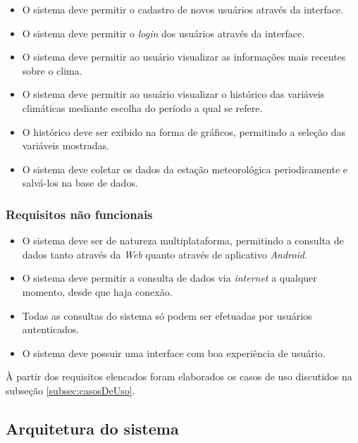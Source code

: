 \begin{itemize}
    \item O sistema deve permitir o cadastro de novos usuários através da interface.
    
    \item O sistema deve permitir o \textit{login} dos usuários através da interface.

    \item O sistema deve permitir ao usuário visualizar as informações mais recentes sobre o clima.

    \item O sistema deve permitir ao usuário visualizar o histórico das variáveis climáticas mediante escolha do período a qual se refere.

	\item O histórico deve ser exibido na forma de gráficos, permitindo a seleção das variáveis mostradas.
	
	\item O sistema deve coletar os dados da estação meteorológica periodicamente e salvá-los na base de dados. 
\end{itemize}

\subsubsection{Requisitos não funcionais}

\begin{itemize}
    \item O sistema deve ser de natureza multiplataforma, permitindo a consulta de dados tanto através da \textit{Web} quanto através de aplicativo \textit{Android}.
    
    \item O sistema deve permitir a consulta de dados via \textit{internet} a qualquer momento, desde que haja conexão.

    \item Todas as consultas do sistema só podem ser efetuadas por usuários autenticados.

    \item O sistema deve possuir uma interface com boa experiência de usuário.

\end{itemize}

À partir dos requisitos elencados foram elaborados os casos de uso discutidos na subseção \ref{subsec:casosDeUso}.

\subsection{Arquitetura do sistema}

